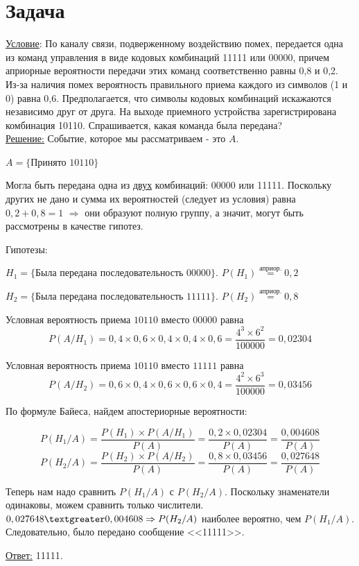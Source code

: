 \documentclass[a4paper,12pt]{article} %
\begin{document}
\section{Задача}
\underline{Условие}: По каналу связи, подверженному воздействию помех, передается одна из команд управления в виде кодовых комбинаций 11111 или 00000, причем априорные вероятности передачи этих команд соответственно равны 0,8 и 0,2. Из-за наличия помех вероятность правильного приема каждого из символов (1 и 0) равна 0,6. Предполагается, что символы кодовых комбинаций искажаются независимо друг от друга. На выходе приемного устройства зарегистрирована комбинация 10110. Спрашивается, какая команда была передана? \\
\underline{Решение:} Событие, которое мы рассматриваем - это $A$.

$A = \{\text{Принято 10110}\}$

Могла быть передана одна из \underline{двух} комбинаций: 00000 или 11111. Поскольку других не дано и сумма их вероятностей (следует из условия) равна $0,2 + 0,8 = 1$ $\Rightarrow$ они образуют полную группу, а значит, могут быть рассмотрены в качестве гипотез.

Гипотезы:

$H_1 = \{\text{Была передана последовательность 00000}\}$. $P(H_1) \overset{\text{априор.}}{=} 0,2$

$H_2 = \{\text{Была передана последовательность 11111}\}$. $P(H_2) \overset{\text{априор.}}{=} 0,8$


Условная вероятность приема $10110$ вместо $00000$ равна
$$P(A/H_1) = 0,4\times 0,6 \times 0,4\times 0,4\times 0,6 = \frac{4^3\times 6^2}{100000} = 0,02304$$

Условная вероятность приема $10110$ вместо $11111$ равна
$$P(A/H_2) = 0,6\times 0,4 \times 0,6\times 0,6\times 0,4 = \frac{4^2\times 6^3}{100000} = 0,03456$$

По формуле Байеса, найдем апостериорные вероятности:

\[
P(H_1/A) = \frac{P(H_1)\times P(A/H_1)}{P(A)} = \frac{0,2\times 0,02304}{P(A)} = \frac{0,004608}{P(A)}
\]
\[
P(H_2/A) = \frac{P(H_2)\times P(A/H_2)}{P(A)} = \frac{0,8\times 0,03456}{P(A)} = \frac{0,027648}{P(A)}
\]

Теперь нам надо сравнить $P(H_1/A)$ с $P(H_2/A)$. Поскольку знаменатели одинаковы, можем сравнить только числители. $0,027648 \textgreater 0,004608 \Rightarrow P(H_2/A)$ наиболее вероятно, чем $P(H_1/A)$. Следовательно, было передано сообщение <<11111>>.

\begin{flushright}
	\underline{Ответ:} 11111.
\end{flushright}
\end{document}
